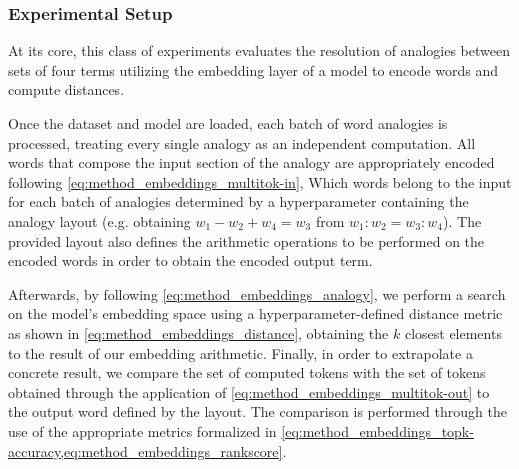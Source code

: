 \subsubsection{Experimental Setup}\label{sssec:exp_emb_exp1_expset}

At its core, this class of experiments evaluates the resolution of analogies between sets of four terms utilizing the embedding layer of a model to encode words and compute distances.

Once the dataset and model are loaded, each batch of word analogies is processed, treating every single analogy as an independent computation.
All words that compose the input section of the analogy are appropriately encoded following \cref{eq:method_embeddings_multitok-in}, 
Which words belong to the input for each batch of analogies  determined by a hyperparameter containing the analogy layout (e.g. obtaining $w_1 - w_2 + w_4 = w_3$ from $w_1 : w_2 = w_3 : w_4$).
The provided layout also defines the arithmetic operations to be performed on the encoded words in order to obtain the encoded output term.

Afterwards, by following \cref{eq:method_embeddings_analogy}, we perform a search on the model's embedding space using a hyperparameter-defined distance metric as shown in \cref{eq:method_embeddings_distance}, obtaining the $k$ closest elements to the result of our embedding arithmetic.
Finally, in order to extrapolate a concrete result, we compare the set of computed tokens with the set of tokens obtained through the application of \cref{eq:method_embeddings_multitok-out} to the output word defined by the layout.
The comparison is performed through the use of the appropriate metrics formalized in \cref{eq:method_embeddings_topk-accuracy,eq:method_embeddings_rankscore}.

